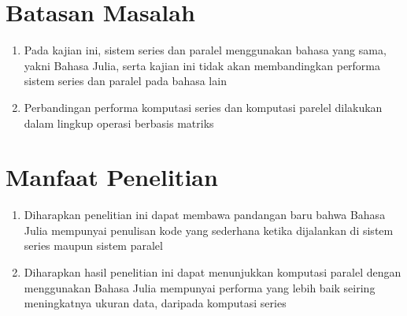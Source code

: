 \section{Batasan Masalah}
\begin{enumerate}
	\item Pada kajian ini, sistem series dan paralel menggunakan bahasa yang sama, yakni
	      Bahasa Julia, serta kajian ini tidak akan membandingkan performa sistem series
	      dan paralel pada bahasa lain

	\item Perbandingan performa komputasi series dan komputasi parelel dilakukan dalam
	      lingkup operasi berbasis matriks
\end{enumerate}

\section{Manfaat Penelitian}
\begin{enumerate}
	\item Diharapkan penelitian ini dapat membawa pandangan baru bahwa Bahasa Julia
	      mempunyai penulisan kode yang sederhana ketika dijalankan di sistem series
	      maupun sistem paralel

	\item Diharapkan hasil penelitian ini dapat menunjukkan komputasi paralel dengan
	      menggunakan Bahasa Julia mempunyai performa yang lebih baik seiring
	      meningkatnya ukuran data, daripada komputasi series
\end{enumerate}
